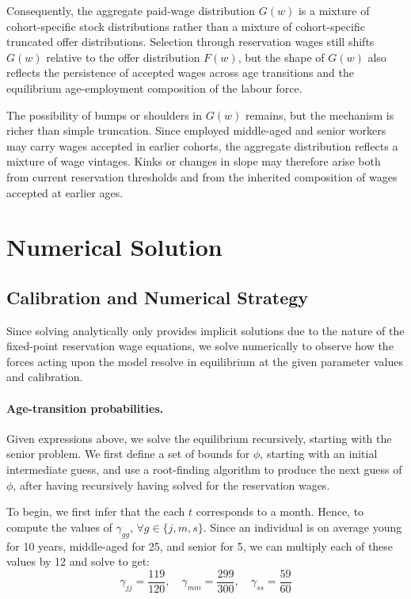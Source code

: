 \documentclass{article}
\begin{document}
Consequently, the aggregate paid-wage distribution $G(w)$ is a mixture of
cohort-specific stock distributions rather than a mixture of cohort-specific
truncated offer distributions. Selection through reservation wages still shifts
$G(w)$ relative to the offer distribution $F(w)$, but the shape of $G(w)$
also reflects the persistence of accepted wages across age transitions and the
equilibrium age-employment composition of the labour force.

The possibility of bumps or shoulders in $G(w)$ remains, but the mechanism is
richer than simple truncation. Since employed middle-aged and senior workers may
carry wages accepted in earlier cohorts, the aggregate distribution reflects a
mixture of wage vintages. Kinks or changes in slope may therefore arise both
from current reservation thresholds and from the inherited composition of wages
accepted at earlier ages.

\section{Numerical Solution}

\subsection{Calibration and Numerical Strategy}

Since solving analytically only provides implicit solutions due to the nature of the fixed-point reservation wage equations, we solve numerically to observe how the forces acting upon the model resolve in equilibrium at the given parameter values and calibration.

\paragraph{Age-transition probabilities.} Given expressions above, we solve the equilibrium recursively, starting with the senior problem. We first define a set of bounds for $\phi$, starting with an initial intermediate guess, and use a root-finding algorithm to produce the next guess of $\phi$, after having recursively having solved for the reservation wages.

To begin, we first infer that the each $t$ corresponds to a month. Hence, to compute the values of $\gamma_{gg}$, $\forall g\in\{j,m,s\}$. Since an individual is on average young for 10 years, middle-aged for 25, and senior for 5, we can multiply each of these values by 12 and solve to get:
\[
\gamma_{jj}=\frac{119}{120},\quad\gamma_{mm}=\frac{299}{300},\quad\gamma_{ss}=\frac{59}{60}
\]
\end{document}

